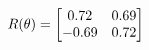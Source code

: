 \documentclass[preview]{standalone}
\begin{document}
\begin{align*}
\special{dvisvgm:raw <g id='unique000'>}R(\theta) = \begin{bmatrix}0.72 & 0.69\\-0.69 & 0.72\end{bmatrix}\special{dvisvgm:raw </g>}
\end{align*}
\end{document}
